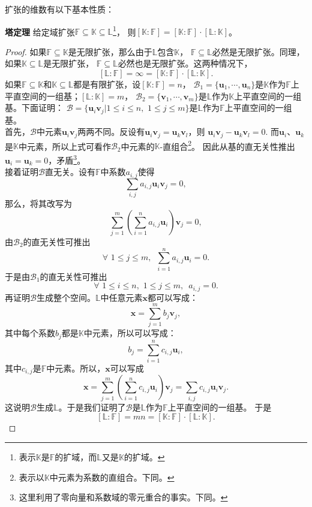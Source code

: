 \documentclass[12pt,UTF8]{ctexbook}
\begin{document}
\begin{appendix}
扩张的维数有以下基本性质：
\begin{pp}\textbf{塔定理 }\label{pp:9_0}
    给定域扩张$\mathbb{F} \subseteq \mathbb{K} \subseteq \mathbb{L}$\footnote{表示$\mathbb{K}$是$\mathbb{F}$的扩域，而$\mathbb{L}$又是$\mathbb{K}$的扩域。}，
    则$[\mathbb{K} : \mathbb{F}] = [\mathbb{K} : \mathbb{F}]\cdot [\mathbb{L} : \mathbb{K}]$。
\end{pp}
\begin{proof} %
    如果$\mathbb{F} \subseteq \mathbb{K}$是无限扩张，那么由于$\mathbb{L}$包含$\mathbb{K}$，
    $\mathbb{F} \subseteq \mathbb{L}$必然是无限扩张。同理，如果$\mathbb{K} \subseteq \mathbb{L}$是无限扩张，
    $\mathbb{F} \subseteq \mathbb{L}$必然也是无限扩张。这两种情况下，
    $$[\mathbb{L} : \mathbb{F}] = \infty = [\mathbb{K} : \mathbb{F}]\cdot [\mathbb{L} : \mathbb{K}].$$
    如果$\mathbb{F} \subseteq \mathbb{K}$和$\mathbb{K} \subseteq \mathbb{L}$都是有限扩张，设$[\mathbb{K} : \mathbb{F}] = n$，
    $\mathcal{B}_1 = \{\mathbf{u}_1, \cdots, \mathbf{u}_n\}$是$\mathbb{K}$作为$\mathbb{F}$上平直空间的一组基；$[\mathbb{L} : \mathbb{K}] = m$，
    $\mathcal{B}_2 = \{\mathbf{v}_1, \cdots, \mathbf{v}_m\}$是$\mathbb{L}$作为$\mathbb{K}$上平直空间的一组基。下面证明：
    $\mathcal{B} = \{\mathbf{u}_i\mathbf{v}_j | 1 \leqslant i \leqslant n, \,\, 1 \leqslant j \leqslant m \}$是$\mathbb{L}$作为$\mathbb{F}$上平直空间的一组基。\\
    首先，$\mathcal{B}$中元素$\mathbf{u}_i\mathbf{v}_j$两两不同。反设有$\mathbf{u}_i\mathbf{v}_j = \mathbf{u}_k\mathbf{v}_l$，则
    $ \mathbf{u}_i\mathbf{v}_j - \mathbf{u}_k\mathbf{v}_l = 0.$ 
    而$\mathbf{u}_i$、$\mathbf{u}_k$是$\mathbb{K}$中元素，所以上式可看作$\mathcal{B}_2$中元素的$\mathbb{K}$-直组合\footnote{表示以$\mathbb{K}$中元素为系数的直组合。下同。}。
    因此从基的直无关性推出$\mathbf{u}_i = \mathbf{u}_k = 0$，矛盾\footnote{这里利用了零向量和系数域的零元重合的事实。下同。}。\\
    接着证明$\mathcal{B}$直无关。设有$\mathbb{F}$中系数$a_{i,j}$使得
    $$ \sum_{i,j} a_{i,j}\mathbf{u}_i\mathbf{v}_j = 0,$$
    那么，将其改写为
    $$ \sum_{j=1}^m \left(\sum_{i=1}^n a_{i,j}\mathbf{u}_i \right) \mathbf{v}_j = 0,$$
    由$\mathcal{B}_2$的直无关性可推出
    $$ \forall \,\, 1 \leqslant j \leqslant m , \,\,\, \sum_{i=1}^n a_{i,j}\mathbf{u}_i = 0.$$
    于是由$\mathcal{B}_1$的直无关性可推出
    $$ \forall \,\, 1 \leqslant i \leqslant n, \,\,1 \leqslant j \leqslant m , \,\,\,a_{i,j} = 0.$$
    再证明$\mathcal{B}$生成整个空间。$\mathbb{L}$中任意元素$\mathbf{x}$都可以写成：
    $$\mathbf{x} = \sum_{j=1}^m b_j \mathbf{v}_j,$$ 
    其中每个系数$b_j$都是$\mathbb{K}$中元素，所以可以写成：
    $$ b_j = \sum_{i=1}^n c_{i,j}\mathbf{u}_i , $$
    其中$c_{i,j}$是$\mathbb{F}$中元素。所以，$\mathbf{x}$可以写成
    $$ \mathbf{x} = \sum_{j=1}^m \left(\sum_{i=1}^n c_{i,j}\mathbf{u}_i \right) \mathbf{v}_j = \sum_{i,j} c_{i,j}\mathbf{u}_i\mathbf{v}_j.$$
    这说明$\mathcal{B}$生成$\mathbb{L}$。于是我们证明了$\mathcal{B}$是$\mathbb{L}$作为$\mathbb{F}$上平直空间的一组基。
    于是
    $$[\mathbb{L} : \mathbb{F}] = mn = [\mathbb{K} : \mathbb{F}]\cdot [\mathbb{L} : \mathbb{K}].$$
\end{proof}
 

\end{appendix}
\end{document}
